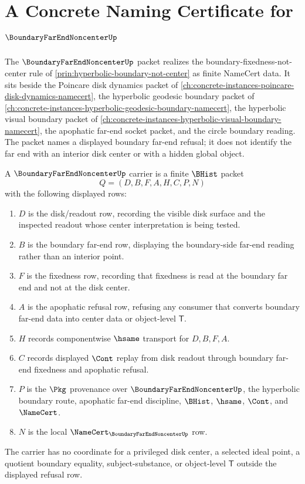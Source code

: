 \chapter{A Concrete Naming Certificate for $\BoundaryFarEndNoncenterUp$}
\label{ch:concrete-instances-boundary-far-end-noncenter-namecert}

The $\BoundaryFarEndNoncenterUp$ packet realizes the boundary-fixedness-not-center rule of \autoref{prin:hyperbolic-boundary-not-center} as finite NameCert data. It sits beside the Poincare disk dynamics packet of \autoref{ch:concrete-instances-poincare-disk-dynamics-namecert}, the hyperbolic geodesic boundary packet of \autoref{ch:concrete-instances-hyperbolic-geodesic-boundary-namecert}, the hyperbolic visual boundary packet of \autoref{ch:concrete-instances-hyperbolic-visual-boundary-namecert}, the apophatic far-end socket packet, and the circle boundary reading. The packet names a displayed boundary far-end refusal; it does not identify the far end with an interior disk center or with a hidden global object.

\begin{definition}
\label{def:boundary-far-end-noncenter-carrier}
A $\BoundaryFarEndNoncenterUp$ carrier is a finite $\BHist$ packet
$$
Q=(D,B,F,A,H,C,P,N)
$$
with the following displayed rows:
\begin{enumerate}
\item $D$ is the disk/readout row, recording the visible disk surface and the inspected readout whose center interpretation is being tested.
\item $B$ is the boundary far-end row, displaying the boundary-side far-end reading rather than an interior point.
\item $F$ is the fixedness row, recording that fixedness is read at the boundary far end and not at the disk center.
\item $A$ is the apophatic refusal row, refusing any consumer that converts boundary far-end data into center data or object-level $\mathsf{T}$.
\item $H$ records componentwise $\hsame$ transport for $D,B,F,A$.
\item $C$ records displayed $\Cont$ replay from disk readout through boundary far-end fixedness and apophatic refusal.
\item $P$ is the $\Pkg$ provenance over $\BoundaryFarEndNoncenterUp$, the hyperbolic boundary route, apophatic far-end discipline, $\BHist$, $\hsame$, $\Cont$, and $\NameCert$.
\item $N$ is the local $\NameCert_{\BoundaryFarEndNoncenterUp}$ row.
\end{enumerate}
The carrier has no coordinate for a privileged disk center, a selected ideal point, a quotient boundary equality, subject-substance, or object-level $\mathsf{T}$ outside the displayed refusal row.
\end{definition}


